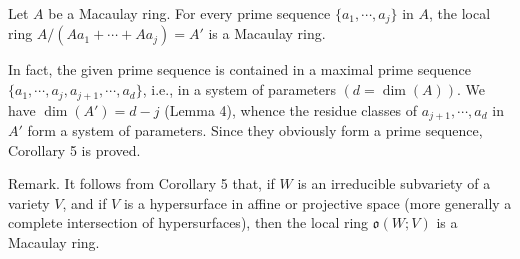 Let $A$ be a Macaulay ring. For every prime sequence $\{a_1, \cdots, a_j\}$ in $A$, the local ring $A / (Aa_1 + \cdots + Aa_j) = A'$ is a Macaulay ring.

In fact, the given prime sequence is contained in a maximal prime sequence $\{a_1, \cdots, a_j, a_{j+1}, \cdots, a_d\}$, i.e., in a system of parameters $(d = \dim(A))$. We have $\dim(A') = d - j$ (Lemma 4), whence the residue classes of $a_{j+1}, \cdots, a_d$ in $A'$ form a system of parameters. Since they obviously form a prime sequence, Corollary 5 is proved.

Remark. It follows from Corollary 5 that, if $W$ is an irreducible subvariety of a variety $V$, and if $V$ is a hypersurface in affine or projective space (more generally a complete intersection of hypersurfaces), then the local ring $\mathfrak{o}(W; V)$ is a Macaulay ring.